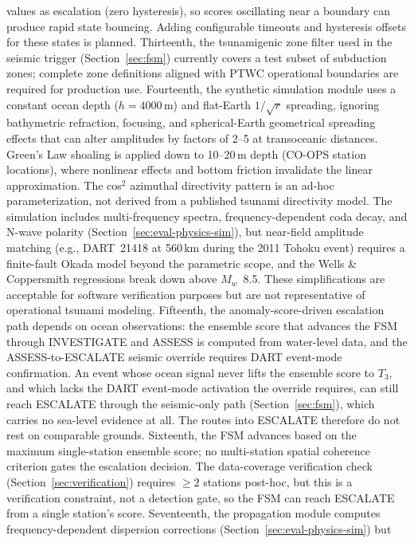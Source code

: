\documentclass{article}
\begin{document}
values as escalation (zero hysteresis), so scores oscillating near a
boundary can produce rapid state bouncing.  Adding configurable
timeouts and hysteresis offsets for these states is planned.
Thirteenth, the tsunamigenic zone filter used in the seismic trigger
(Section~\ref{sec:fsm}) currently covers a test subset of subduction
zones; complete zone definitions aligned with PTWC operational
boundaries are required for production use.
Fourteenth, the synthetic simulation module uses a constant ocean
depth ($h = 4000$\,m) and flat-Earth $1/\sqrt{r}$ spreading, ignoring
bathymetric refraction, focusing, and spherical-Earth geometrical
spreading effects that can alter amplitudes by factors of 2--5 at
transoceanic distances.  Green's Law shoaling is applied down to
10--20\,m depth (CO-OPS station locations), where nonlinear effects
and bottom friction invalidate the linear approximation.  The
cos$^2$ azimuthal directivity pattern is an ad-hoc parameterization,
not derived from a published tsunami directivity model.
The simulation includes multi-frequency spectra, frequency-dependent
coda decay, and N-wave polarity (Section~\ref{sec:eval-physics-sim}),
but near-field amplitude matching (e.g., DART~21418 at 560\,km during
the 2011 Tohoku event) requires a finite-fault Okada model beyond the
parametric scope, and the Wells \& Coppersmith regressions break down
above $M_w$~8.5.
These simplifications are acceptable for software verification
purposes but are not representative of operational tsunami modeling.
Fifteenth, the anomaly-score-driven escalation path depends on
ocean observations: the ensemble score that advances the FSM through
INVESTIGATE and ASSESS is computed from water-level data, and the
ASSESS-to-ESCALATE seismic override requires DART event-mode
confirmation.  An event whose ocean signal never lifts the ensemble
score to $T_3$, and which lacks the DART event-mode activation the
override requires, can still reach ESCALATE through the seismic-only
path (Section~\ref{sec:fsm}), which carries no sea-level evidence at
all.  The routes into ESCALATE therefore do not rest on comparable
grounds.
Sixteenth, the FSM advances based on the maximum single-station
ensemble score; no multi-station spatial coherence criterion gates
the escalation decision.  The data-coverage verification check
(Section~\ref{sec:verification}) requires $\geq 2$ stations post-hoc,
but this is a verification constraint, not a detection gate, so the
FSM can reach ESCALATE from a single station's score.
Seventeenth, the propagation module computes frequency-dependent
dispersion corrections (Section~\ref{sec:eval-physics-sim}) but
\end{document}
